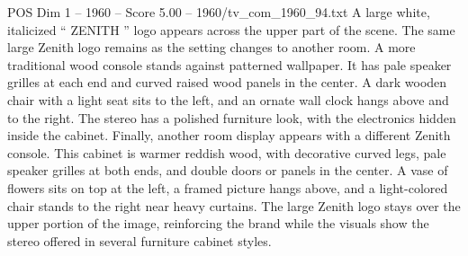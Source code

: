 \begin{textsample}{POS Dim 1 – 1960 – Score 5.00 – 1960/tv\_com\_1960\_94.txt}
A large white, italicized “ ZENITH ” logo appears across the upper part of the scene.
The same large Zenith logo remains as the setting changes to another room.
A more traditional wood console stands against patterned wallpaper.
It has pale speaker grilles at each end and curved raised wood panels in the center.
A dark wooden chair with a light seat sits to the left, and an ornate wall clock hangs above and to the right.
The stereo has a polished furniture look, with the electronics hidden inside the cabinet.
Finally, another room display appears with a different Zenith console.
This cabinet is warmer reddish wood, with decorative curved legs, pale speaker grilles at both ends, and double doors or panels in the center.
A vase of flowers sits on top at the left, a framed picture hangs above, and a light-colored chair stands to the right near heavy curtains.
The large Zenith logo stays over the upper portion of the image, reinforcing the brand while the visuals show the stereo offered in several furniture cabinet styles.

\end{textsample}
